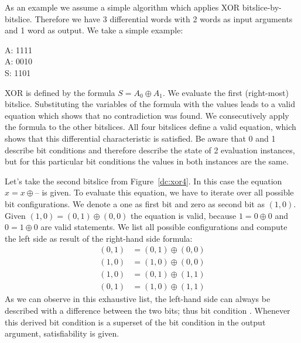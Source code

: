 As an example we assume a simple algorithm which applies XOR bitslice-by-bitslice. Therefore we have 3 differential words with 2 words as input arguments and 1 word as output. We take a simple example:
\begin{center}
  \begin{diffchar}
    A: 1111 \\
    A: 0010 \\
    S: 1101
  \end{diffchar}
\end{center}
XOR is defined by the formula $S = A_0 \oplus A_1$. We evaluate the first (right-most) bitslice. Substituting the variables of the formula with the values leads to a valid equation which shows that no contradiction was found. We consecutively apply the formula to the other bitslices. All four bitslices define a valid equation, which shows that this differential characteristic is satisfied. Be aware that 0 and 1 describe bit conditions and therefore describe the state of 2 evaluation instances, but for this particular bit conditions the values in both instances are the same.

Let's take the second bitslice from Figure~\ref{dc:xor4}. In this case the equation $x = x \oplus \mbox{--}$ is given. To evaluate this equation, we have to iterate over all possible bit configurations. We denote a one as first bit and zero as second bit as $(1, 0)$. Given $(1, 0) = (0, 1) \oplus (0, 0)$ the equation is valid, because $1 = 0 \oplus 0$ and $0 = 1 \oplus 0$ are valid statements. We list all possible configurations and compute the left side as result of the right-hand side formula:
\begin{align*}
    (0, 1) &= (0, 1) \oplus (0, 0) \\
    (1, 0) &= (1, 0) \oplus (0, 0) \\
    (1, 0) &= (0, 1) \oplus (1, 1) \\
    (0, 1) &= (1, 0) \oplus (1, 1)
\end{align*}
As we can observe in this exhaustive list, the left-hand side can always be described with a difference between the two bits; thus bit condition . Whenever this derived bit condition is a superset of the bit condition in the output argument, satisfiability is given.

